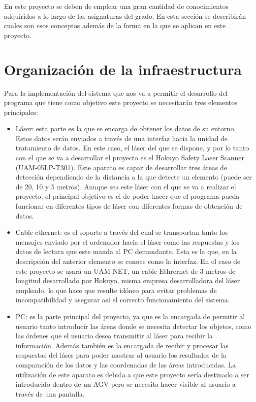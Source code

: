 
En este proyecto se deben de emplear una gran cantidad de  conocimientos adquiridos a lo largo de las asignaturas del grado. En esta sección se describirán cuales son esos conceptos además de la forma en la que se aplican en este proyecto.

\section{Organización de la infraestructura}

Para la implementación del sistema que nos va a permitir el desarrollo del programa que tiene como objetivo este proyecto se necesitarán tres elementos principales:
\begin{itemize}
	 \item Láser: esta parte es la que se encarga de obtener los datos de su entorno. Estos datos serán enviados a través de una interfaz hacia la unidad de tratamiento de datos. En este caso, el láser del que se dispone, y por lo tanto con el que se va a desarrollar el proyecto es el Hokuyo Safety Laser Scanner (UAM-05LP-T301). Este aparato es capaz de desarrollar tres áreas de detección dependiendo de la distancia a la que detecte un elemento (puede ser de 20, 10 y 5 metros). Aunque sea este láser con el que se va a realizar el proyecto, el principal objetivo es el de poder hacer que el programa pueda funcionar en diferentes tipos de láser con diferentes formas de obtención de datos.\\
    \item Cable ethernet: es el soporte a través del cual se transportan tanto los mensajes enviado por el ordenador hacia el láser como las respuestas y los datos de lectura que este manda al PC demandante. Esta es la que, en la descripción del anterior elemento se conoce como la interfaz. En el caso de este proyecto se usará un UAM-NET, un cable Ethrernet de 3 metros de longitud desarrollado por Hokuyo, misma empresa desarrolladora del láser empleado, lo que hace que resulte idóneo para evitar problemas de incompatibilidad y asegurar así el correcto funcionamiento del sistema.
    \item PC: es la parte principal del proyecto, ya que es la encargada de permitir al usuario tanto introducir las áreas donde se necesita detectar los objetos, como las órdenes que el usuario desea transmitir al láser para recibir la información. Además también es la encargada de recibir y procesar las respuestas del láser para poder mostrar al usuario los resultados de la comparación de los datos y las coordenadas de las áreas introducidas. La utilización de este aparato es debida a que este proyecto sería destinado a ser introducido dentro de un AGV pero se necesita hacer visible al usuario a través de una pantalla.\\ 
\end{itemize}

